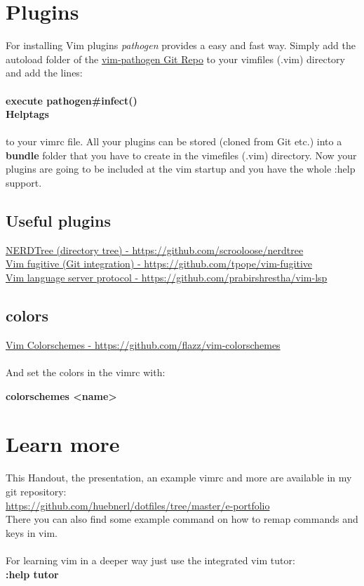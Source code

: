 \documentclass[a4paper, 10pt]{scrartcl}
\begin{document}
\section{Plugins}
For installing Vim plugins \textit{pathogen} provides a easy and fast way. Simply add the autoload folder of the \href{https://github.com/tpope/vim-pathogen}{vim-pathogen Git Repo} to your vimfiles (.vim) directory and add the lines:
\\
\\
\textbf{execute pathogen\#infect()\\Helptags}
\\
\\
to your vimrc file. All your plugins can be stored (cloned from Git etc.) into a \textbf{bundle} folder that you have to create in the vimefiles (.vim) directory. Now your plugins are going to be included at the vim startup and you have the whole :help support.
\subsection{Useful plugins}
\href{https://github.com/scrooloose/nerdtree}{NERDTree (directory tree) - https://github.com/scrooloose/nerdtree}
\\
\href{https://github.com/tpope/vim-fugitive}{Vim fugitive (Git integration) - https://github.com/tpope/vim-fugitive}
\\
\href{https://github.com/prabirshrestha/vim-lsp}{Vim language server protocol - https://github.com/prabirshrestha/vim-lsp}
\subsection{colors}
\href{https://github.com/flazz/vim-colorschemes}{Vim Colorschemes - https://github.com/flazz/vim-colorschemes}
\\
\\
And set the colors in the vimrc with:

\textbf{colorschemes <name>}
\section{Learn more}
This Handout, the presentation, an example vimrc and more are available in my git repository:
\\
\href{https://github.com/huebnerl/dotfiles/tree/master/e-portfolio}{https://github.com/huebnerl/dotfiles/tree/master/e-portfolio}
\\
There you can also find some example command on how to remap commands and keys in vim.
\\
\\
For learning vim in a deeper way just use the integrated vim tutor:
\\
\textbf{:help tutor}
\end{document}
